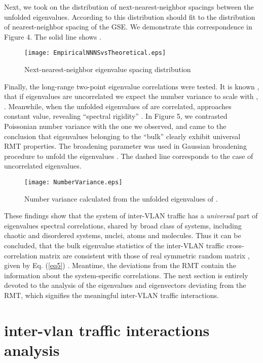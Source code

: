 \documentclass{IEEEtran}
\begin{document}
Next, we took on the distribution  of next-nearest-neighbor
spacings  between the unfolded eigenvalues.
According to \cite{Dyson2} this distribution should fit to the distribution
of nearest-neighbor spacing of the GSE. We demonstrate this correspondence
in Figure 4. The solid line shows .\begin{figure}[h]
\begin{center}\texttt{[image: EmpiricalNNNSvsTheoretical.eps]}\end{center}


\caption{\label{4} Next-nearest-neighbor eigenvalue spacing distribution
 }
\end{figure}
Finally, the long-range two-point eigenvalue correlations were tested.
It is known \cite{Mehta,Brody,Guhr3}, that if eigenvalues are uncorrelated
we expect the number variance to scale with , .
Meanwhile, when the unfolded eigenvalues of  are correlated, 
approaches constant value, revealing {}``spectral rigidity'' \cite{Mehta,Brody,Guhr3}.
In Figure 5, we contrasted Poissonian number variance with the one
we observed, and came to the conclusion that eigenvalues belonging
to the {}``bulk'' clearly exhibit universal RMT properties. The
broadening parameter  was used in Gaussian broadening procedure
to unfold the eigenvalues  \cite{Bruus,Bruus2,Guhr1,Sharifi}.
The dashed line corresponds to the case of uncorrelated eigenvalues.\begin{figure}[h]
\begin{center}\texttt{[image: NumberVariance.eps]}\end{center}


\caption{\label{5} Number variance  calculated
from the unfolded eigenvalues  of . }
\end{figure}
These findings show that the system of inter-VLAN traffic has a \emph{universal}
part of eigenvalues spectral correlations, shared by broad class of
systems, including chaotic and disordered systems, nuclei, atoms and
molecules. Thus it can be concluded, that the bulk eigenvalue statistics
of the inter-VLAN traffic cross-correlation matrix  are consistent
with those of real symmetric random matrix , given by Eq. (\ref{eq5})
\cite{Sengupta}. Meantime, the deviations from the RMT contain the
information about the system-specific correlations. The next section
is entirely devoted to the analysis of the eigenvalues and eigenvectors
deviating from the RMT, which signifies the meaningful inter-VLAN
traffic interactions.


\section{inter-vlan traffic interactions analysis}
\end{document}
